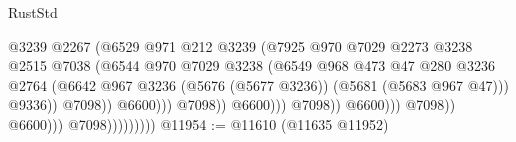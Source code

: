 \begin{lexlean}{RustStd}
\begin{coremodule}
                                                          @3239
                                                          @2267
                                                          (@6529
                                                            @971
                                                            @212
                                                            @3239
                                                            (@7925
                                                              @970
                                                              @7029
                                                              @2273
                                                              @3238
                                                              @2515
                                                              @7038
                                                              (@6544
                                                                @970
                                                                @7029
                                                                @3238
                                                                (@6549
                                                                  @968
                                                                  @473
                                                                  @47
                                                                  @280
                                                                  @3236
                                                                  @2764
                                                                  (@6642
                                                                    @967
                                                                    @3236
                                                                    (@5676 (@5677 @3236))
                                                                    (@5681 (@5683 @967 @47)))
                                                                  @9336))
                                                              @7098))
                                                          @6600)))
                                                    @7098))
                                                @6600)))
                                          @7098))
                                      @6600)))
                                @7098))
                            @6600)))
                      @7098)))))))))
@11954 := @11610 (@11635 @11952)

\end{coremodule}
\end{lexlean}
